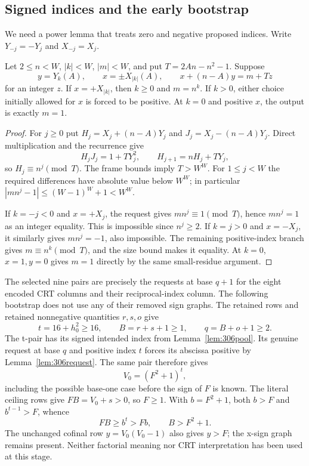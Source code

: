 \subsection{Signed indices and the early bootstrap}

We need a power lemma that treats zero and negative proposed indices.
Write $Y_{-j}=-Y_j$ and $X_{-j}=X_j$.

\begin{lemma}\label{lem:306request}
Let $2\leq n<W$, $|k|<W$, $|m|<W$, and put
$T=2An-n^2-1$.  Suppose
\[
 y=Y_k(A),\qquad x=\pm X_{|k|}(A),\qquad
 x+(n-A)y=m+Tz
\]
for an integer $z$.  If $x=+X_{|k|}$, then $k\geq0$ and $m=n^k$.
If $k>0$, either choice initially allowed for $x$ is forced to be positive.
At $k=0$ and positive $x$, the output is exactly $m=1$.
\end{lemma}

\begin{proof}
For $j\geq0$ put
$H_j=X_j+(n-A)Y_j$ and $J_j=X_j-(n-A)Y_j$.  Direct multiplication and
the recurrence give
\[
 H_jJ_j=1+TY_j^2,\qquad H_{j+1}=nH_j+TY_j,
\]
so $H_j\equiv n^j\pmod T$.  The frame bounds imply $T>W^W$.  For
$1\leq j<W$ the required differences have absolute value below $W^W$;
in particular
$|mn^j-1|\leq(W-1)^W+1<W^W$.

If $k=-j<0$ and $x=+X_j$, the request gives
$mn^j\equiv1\pmod T$, hence $mn^j=1$ as an integer equality.  This is
impossible since $n^j\geq2$.  If $k=j>0$ and $x=-X_j$, it similarly gives
$mn^j=-1$, also impossible.  The remaining positive-index branch gives
$m\equiv n^k\pmod T$, and the size bound makes it equality.  At $k=0$,
$x=1,y=0$ gives $m=1$ directly by the same small-residue argument.
\end{proof}

The selected nine pairs are precisely the requests at base $q+1$ for
the eight encoded CRT columns and their reciprocal-index column.  The
following bootstrap does not use any of their removed sign graphs.
The retained rows and retained nonnegative quantities $r,s,o$ give
\[
 t=16+h_0^2\geq16,\qquad B=r+s+1\geq1,\qquad q=B+o+1\geq2.
\]
The t-pair has its signed intended index from Lemma~\ref{lem:306pool}.
Its genuine request at base $q$ and positive index $t$ forces its abscissa
positive by Lemma~\ref{lem:306request}.  The same pair therefore gives
\[
 V_0=(F^2+1)^t,
\]
including the possible base-one case before the sign of $F$ is known.
The literal ceiling rows give $FB=V_0+s>0$, so $F\geq1$.  With
$b=F^2+1$, both $b>F$ and $b^{t-1}>F$, whence
\begin{equation}\label{eq:306Bbound}
 FB\geq b^t>Fb,\qquad B>F^2+1.
\end{equation}
The unchanged cofinal row $y=V_0(V_0-1)$ also gives $y>F$; the x-sign
graph remains present.  Neither factorial meaning nor CRT interpretation
has been used at this stage.

